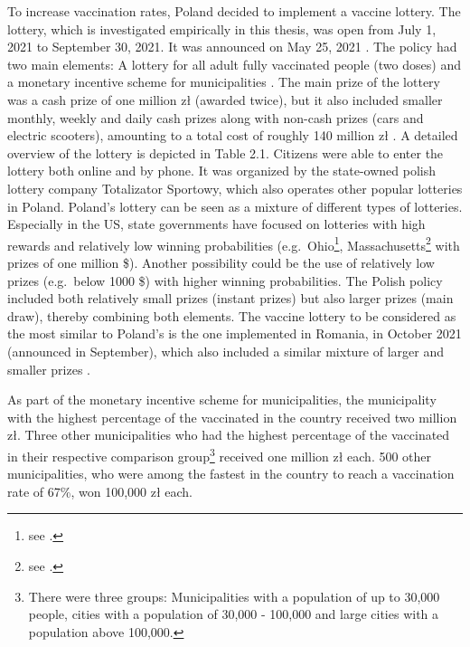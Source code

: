 \documentclass{scrbook}
\begin{document}
To increase vaccination rates, Poland decided to implement a vaccine
lottery. The lottery, which is investigated empirically in this thesis,
was open from July 1, 2021 to September 30, 2021. It was announced on
May 25, 2021 \parencite{charlish_poland_2021}. The policy had two main
elements: A lottery for all adult fully vaccinated people (two doses)
\parencite{service_of_the_republic_of_poland_national_2021} and a
monetary incentive scheme for municipalities
\parencite{service_of_the_republic_of_poland_competitions_2021}. The
main prize of the lottery was a cash prize of one million zł (awarded
twice), but it also included smaller monthly, weekly and daily cash
prizes along with non-cash prizes (cars and electric scooters),
amounting to a total cost of roughly 140 million zł
\parencite{wilczek_poland_2021}. A detailed overview of the lottery is
depicted in Table 2.1. Citizens were able to enter the lottery both
online and by phone. It was organized by the state-owned polish lottery
company Totalizator Sportowy, which also operates other popular
lotteries in Poland. Poland's lottery can be seen as a mixture of
different types of lotteries. Especially in the US, state governments
have focused on lotteries with high rewards and relatively low winning
probabilities
(e.g.~Ohio\footnote{see \textcite{ohio_department_of_health_ohio_2021}.},
Massachusetts\footnote{see \textcite{commonwealth_of_massachusetts_massachusetts_2021}.}
with prizes of one million \$). Another possibility could be the use of
relatively low prizes (e.g.~below 1000 \$) with higher winning
probabilities. The Polish policy included both relatively small prizes
(instant prizes) but also larger prizes (main draw), thereby combining
both elements. The vaccine lottery to be considered as the most similar
to Poland's is the one implemented in Romania, in October 2021
(announced in September), which also included a similar mixture of
larger and smaller prizes
\parencite{health_ministry_of_romania_press_2021}.

As part of the monetary incentive scheme for municipalities, the
municipality with the highest percentage of the vaccinated in the
country received two million zł. Three other municipalities who had the
highest percentage of the vaccinated in their respective comparison
group\footnote{There were three groups: Municipalities with a population of up to 30,000 people, cities with a population of 30,000 - 100,000 and large cities with a population above 100,000.}
received one million zł each. 500 other municipalities, who were among
the fastest in the country to reach a vaccination rate of 67\%, won
100,000 zł each.
\end{document}
